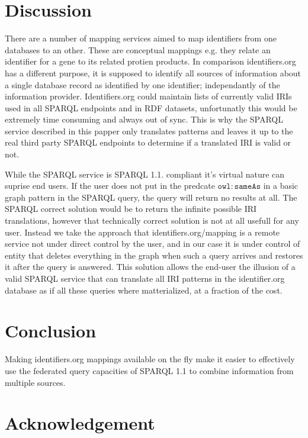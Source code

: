 \documentclass{bioinfo}
\begin{document}
\section{Discussion}

There are a number of mapping services aimed to map identifiers from one databases to an other.
These are conceptual mappings e.g. they relate an identifier for a gene to its related protien products.
In comparison identifiers.org has a different purpose, it is supposed to identify all sources of information about a single database record as identified by one identifier; independantly of the information provider.
Identifiers.org could maintain lists of currently valid IRIs used in all SPARQL endpoints and in RDF datasets,
unfortunatly this would be extremely time consuming and always out of sync.
This is why the SPARQL service described in this papper only translates patterns and leaves it up to the real third party SPARQL endpoints to determine if a translated IRI is valid or not.

While the SPARQL service is SPARQL 1.1. compliant it's virtual nature can suprise end users.
If the user does not put in the predcate $\mathtt{owl\colon{}sameAs}$ in a basic graph pattern in the SPARQL query, the query will return no results at all.
The SPARQL correct solution would be to return the infinite possible IRI translations,
however that technically correct solution is not at all usefull for any user.
Instead we take the approach that identifiers.org/mapping is a remote service not under direct control by the user,
and in our case it is under control of entity that deletes everything in the graph when such a query arrives and restores it after the query is answered.
This solution allows the end-user the illusion of a valid SPARQL service that can translate all IRI patterns in the identifier.org database as if all these
queries where matterialized, at a fraction of the cost. 

\section{Conclusion}
Making identifiers.org mappings available on the fly make it easier to effectively use the federated query capacities of SPARQL 1.1 to combine information from multiple sources.

\section*{Acknowledgement}
\end{document}
